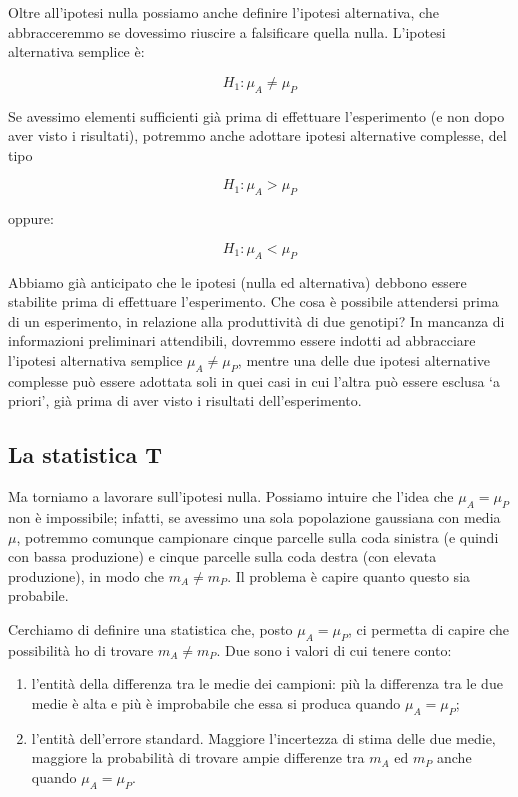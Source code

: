 \documentclass[a4paper,12pt,oneside]{book}
\providecommand{\tightlist}{%
  \setlength{\itemsep}{0pt}\setlength{\parskip}{0pt}}
\begin{document}
Oltre all'ipotesi nulla possiamo anche definire l'ipotesi alternativa, che abbracceremmo se dovessimo riuscire a falsificare quella nulla. L'ipotesi alternativa semplice è:

\[H_1 :\mu_A  \ne \mu_P\]

Se avessimo elementi sufficienti già prima di effettuare l'esperimento (e non dopo aver visto i risultati), potremmo anche adottare ipotesi alternative complesse, del tipo

\[H_1 :\mu_A  > \mu_P\]

oppure:

\[H_1 :\mu_A  < \mu_P\]

Abbiamo già anticipato che le ipotesi (nulla ed alternativa) debbono essere stabilite prima di effettuare l'esperimento. Che cosa è possibile attendersi prima di un esperimento, in relazione alla produttività di due genotipi? In mancanza di informazioni preliminari attendibili, dovremmo essere indotti ad abbracciare l'ipotesi alternativa semplice \(\mu_A \neq \mu_P\), mentre una delle due ipotesi alternative complesse può essere adottata soli in quei casi in cui l'altra può essere esclusa `a priori', già prima di aver visto i risultati dell'esperimento.

\hypertarget{la-statistica-t}{%
\subsection{La statistica T}\label{la-statistica-t}}

Ma torniamo a lavorare sull'ipotesi nulla. Possiamo intuire che l'idea che \(\mu_A = \mu_P\) non è impossibile; infatti, se avessimo una sola popolazione gaussiana con media \(\mu\), potremmo comunque campionare cinque parcelle sulla coda sinistra (e quindi con bassa produzione) e cinque parcelle sulla coda destra (con elevata produzione), in modo che \(m_A \neq m_P\). Il problema è capire quanto questo sia probabile.

Cerchiamo di definire una statistica che, posto \(\mu_A = \mu_P\), ci permetta di capire che possibilità ho di trovare \(m_A \neq m_P\). Due sono i valori di cui tenere conto:

\begin{enumerate}
\def\labelenumi{\arabic{enumi}.}
\tightlist
\item
  l'entità della differenza tra le medie dei campioni: più la differenza tra le due medie è alta e più è improbabile che essa si produca quando \(\mu_A = \mu_P\);
\item
  l'entità dell'errore standard. Maggiore l'incertezza di stima delle due medie, maggiore la probabilità di trovare ampie differenze tra \(m_A\) ed \(m_P\) anche quando \(\mu_A = \mu_P\).
\end{enumerate}
\end{document}
